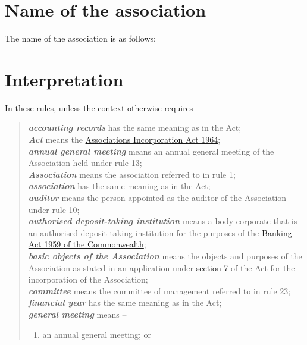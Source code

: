 \documentclass[a4paper,11pt]{article}
\begin{document}
\section{Name of the association}

The name of the association is as follows:\\
\textbf{\orgName{}}

\section{Interpretation}

In these rules, unless the context otherwise requires --
\begin{quote}
	\textit{\textbf{accounting records}} has the same meaning as in the Act;\\
	\textit{\textbf{Act}} means the \href{https://www.legislation.tas.gov.au/view/html/inforce/2019-05-06/act-1964-064}{Associations Incorporation Act 1964};\\
	\textit{\textbf{annual general meeting}} means an annual general meeting of the Association held under rule 13;\\
	\textit{\textbf{Association}} means the association referred to in rule 1;\\
	\textit{\textbf{association}} has the same meaning as in the Act;\\
	\textit{\textbf{auditor}} means the person appointed as the auditor of the Association under rule 10;\\
	\textit{\textbf{authorised deposit-taking institution}} means a body corporate that is an authorised deposit-taking institution for the purposes of the \href{https://www.legislation.gov.au/Details/C2017C00067}{Banking Act 1959 of the Commonwealth};\\
	\textit{\textbf{basic objects of the Association}} means the objects and purposes of the Association as stated in an application under \href{https://www.legislation.tas.gov.au/view/html/inforce/2019-05-06/act-1964-064#GS7@EN}{section 7} of the Act for the incorporation of the Association;\\
	\textit{\textbf{committee}} means the committee of management referred to in rule 23;\\
	\textit{\textbf{financial year}} has the same meaning as in the Act;\\
	\textit{\textbf{general meeting}} means --
	\begin{enumerate}
		\item an annual general meeting; or

\end{enumerate}
\end{quote}
\end{document}
